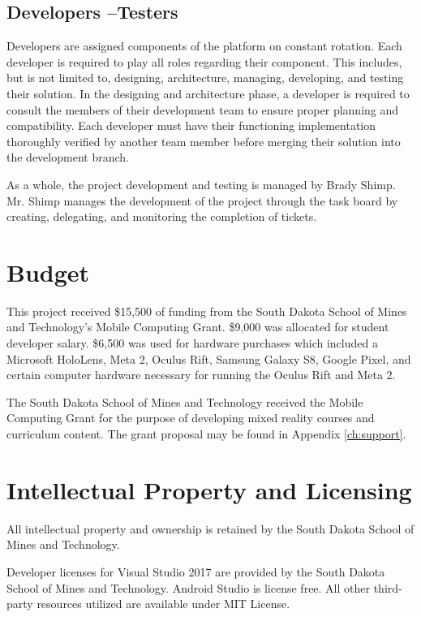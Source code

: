 \subsection{Developers --Testers}

Developers are assigned components of the platform on constant rotation. Each developer is required to play all roles regarding their component. This includes, but is not limited to, designing, architecture, managing, developing, and testing their solution. In the designing and architecture phase, a developer is required to consult the members of their development team to ensure proper planning and compatibility. Each developer must have their functioning implementation thoroughly verified by another team member before merging their solution into the development branch. 

As a whole, the project development and testing is managed by Brady Shimp. Mr. Shimp manages the development of the project through the task board by creating, delegating, and monitoring the completion of tickets. 

\section{Budget}

This project received \$15,500 of funding from the South Dakota School of Mines and Technology's Mobile Computing Grant. \$9,000 was allocated for student developer salary. \$6,500 was used for hardware purchases which included a Microsoft HoloLens, Meta 2, Oculus Rift, Samsung Galaxy S8, Google Pixel, and certain computer hardware necessary for running the Oculus Rift and Meta 2. 
 
The South Dakota School of Mines and Technology received the Mobile Computing Grant for the purpose of developing mixed reality courses and curriculum content. The grant proposal may be found in Appendix \ref{ch:support}.

\section{Intellectual Property and Licensing}

All intellectual property and ownership is retained by the South Dakota School of Mines and Technology.

Developer licenses for Visual Studio 2017 are provided by the South Dakota School of Mines and Technology. Android Studio is license free. All other third-party resources utilized are available under MIT License. 

